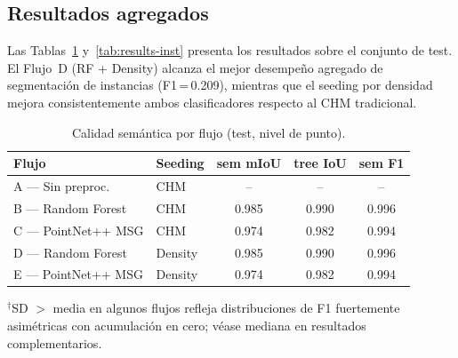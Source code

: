 \documentclass[runningheads]{llncs}
\begin{document}
\subsection{Resultados agregados}

Las Tablas~\ref{tab:results-sem} y~\ref{tab:results-inst} presenta los resultados sobre el conjunto de test. El Flujo~D (RF + Density) alcanza el mejor desempeño agregado de segmentación de instancias (F1\,=\,0.209), mientras que el seeding por densidad mejora consistentemente ambos clasificadores respecto al CHM tradicional.

\begin{table}[H]
\centering
\caption{Calidad sem\'antica por flujo (test, nivel de punto).}\label{tab:results-sem}
\begin{tabular}{llccc}
\toprule
Flujo & Seeding & sem mIoU & tree IoU & sem F1 \\
\midrule
A --- Sin preproc.       & CHM     & --    & --    & --    \\
B --- Random Forest      & CHM     & 0.985 & 0.990 & 0.996 \\
C --- PointNet++ MSG     & CHM     & 0.974 & 0.982 & 0.994 \\
D --- Random Forest      & Density & 0.985 & 0.990 & 0.996 \\
E --- PointNet++ MSG     & Density & 0.974 & 0.982 & 0.994 \\
\bottomrule
\end{tabular}
\end{table}

\begin{table}[H]
\centering
\caption{Resultados de segmentaci\'on de instancias (test, IoU~3D~$\geq 0.5$, media $\pm$ SD sobre $n=11$~plots).}\label{tab:results-inst}
\vspace{1mm}
{\footnotesize $^\dagger$SD $>$ media en algunos flujos refleja distribuciones de F1 fuertemente asim\'etricas con acumulaci\'on en cero; v\'ease mediana en resultados complementarios.}
\end{table}
\end{document}
